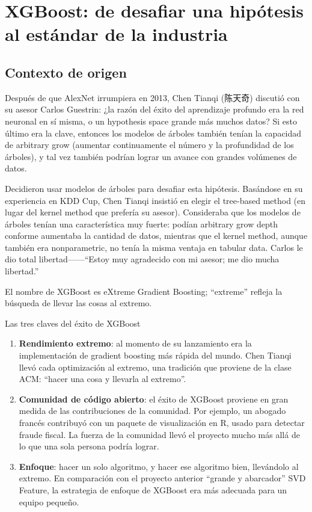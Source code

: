 \section{XGBoost: de desafiar una hipótesis al estándar de la industria}

\subsection{Contexto de origen}

Después de que AlexNet irrumpiera en 2013, Chen Tianqi (陈天奇) discutió con su asesor Carlos Guestrin: ¿la razón del éxito del aprendizaje profundo era la red neuronal en sí misma, o un hypothesis space grande más muchos datos? Si esto último era la clave, entonces los modelos de árboles también tenían la capacidad de arbitrary grow (aumentar continuamente el número y la profundidad de los árboles), y tal vez también podrían lograr un avance con grandes volúmenes de datos.

Decidieron usar modelos de árboles para desafiar esta hipótesis. Basándose en su experiencia en KDD Cup, Chen Tianqi insistió en elegir el tree-based method (en lugar del kernel method que prefería su asesor). Consideraba que los modelos de árboles tenían una característica muy fuerte: podían arbitrary grow depth conforme aumentaba la cantidad de datos, mientras que el kernel method, aunque también era nonparametric, no tenía la misma ventaja en tabular data. Carlos le dio total libertad------``Estoy muy agradecido con mi asesor; me dio mucha libertad.''

El nombre de XGBoost es eXtreme Gradient Boosting; ``extreme'' refleja la búsqueda de llevar las cosas al extremo.

\begin{importantbox}{Las tres claves del éxito de XGBoost}
\begin{enumerate}
    \item \textbf{Rendimiento extremo}: al momento de su lanzamiento era la implementación de gradient boosting más rápida del mundo. Chen Tianqi llevó cada optimización al extremo, una tradición que proviene de la clase ACM: ``hacer una cosa y llevarla al extremo''.
    \item \textbf{Comunidad de código abierto}: el éxito de XGBoost proviene en gran medida de las contribuciones de la comunidad. Por ejemplo, un abogado francés contribuyó con un paquete de visualización en R, usado para detectar fraude fiscal. La fuerza de la comunidad llevó el proyecto mucho más allá de lo que una sola persona podría lograr.
    \item \textbf{Enfoque}: hacer un solo algoritmo, y hacer ese algoritmo bien, llevándolo al extremo. En comparación con el proyecto anterior ``grande y abarcador'' SVD Feature, la estrategia de enfoque de XGBoost era más adecuada para un equipo pequeño.
\end{enumerate}
\end{importantbox}


